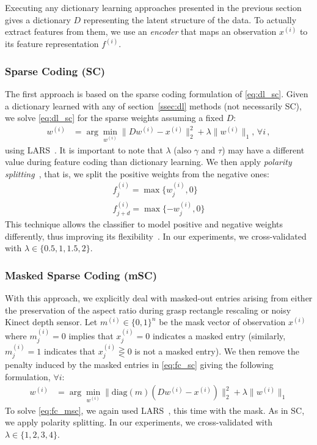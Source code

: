 \documentclass[svgnames]{scrartcl}
\begin{document}
Executing any dictionary learning approaches presented in the previous section gives a dictionary $D$ representing the latent structure of the data. To actually extract features from them, we use an \textit{encoder} that maps an observation $x^{(i)}$ to its feature representation $f^{(i)}$.

\subsubsection{Sparse Coding (SC)}

The first approach is based on the sparse coding formulation of \eqref{eq:dl_sc}. Given a dictionary learned with any of section~\ref{ssec:dl} methods (not necessarily SC), we solve \eqref{eq:dl_sc} for the sparse weights assuming a fixed $D$:
\begin{align}
\label{eq:fc_sc}
w^{(i)} &= \arg \min_{w^{(i)}} \| D w^{(i)} - x^{(i)} \|_2^2 + \lambda \| w^{(i)} \|_1, \, \forall i \, ,
\end{align}
using LARS~\citep{efron2004least}. It is important to note that $\lambda$ (also $\gamma$ and $\tau$) may have a different value during feature coding than dictionary learning. We then apply \textit{polarity splitting}~\citep{coates2011importance}, that is, we split the positive weights from the negative ones:
\begin{align*}
f^{(i)}_j = \max\{w^{(i)}_j, 0\} \\
f^{(i)}_{j+d} = \max\{-w^{(i)}_j, 0\}
\end{align*}
This technique allows the classifier to model positive and negative weights differently, thus improving its flexibility~\citep{coates2011importance}. In our experiments, we cross-validated with $\lambda \in \{0.5, 1, 1.5, 2\}$.

\subsubsection{Masked Sparse Coding (mSC)}
With this approach, we explicitly deal with masked-out entries arising from either the preservation of the aspect ratio during grasp rectangle rescaling or noisy Kinect depth sensor. Let $m^{(i)} \in \{0,1\}^n$ be the mask vector of observation $x^{(i)}$ where $m^{(i)}_j = 0$ implies that $x^{(i)}_j = 0$ indicates a masked entry (similarly, $m^{(i)}_j = 1$ indicates that $x^{(i)}_j \gtreqless 0$ is not a masked entry). We then remove the penalty induced by the masked entries in \eqref{eq:fc_sc} giving the following formulation, $\forall i $:
\begin{align}
\label{eq:fc_msc}
w^{(i)} &= \arg \min_{w^{(i)}} \| \text{diag}(m) (D w^{(i)} - x^{(i)}) \|_2^2 + \lambda \| w^{(i)} \|_1
\end{align}
To solve \eqref{eq:fc_msc}, we again used LARS~\citep{efron2004least}, this time with the mask. As in SC, we apply polarity splitting. In our experiments, we cross-validated with $\lambda \in \{1, 2, 3, 4\}$.
\end{document}
